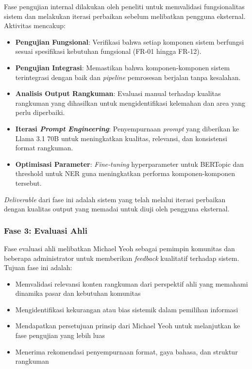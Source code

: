 Fase pengujian internal dilakukan oleh peneliti untuk memvalidasi fungsionalitas sistem dan melakukan iterasi perbaikan sebelum melibatkan pengguna eksternal. Aktivitas mencakup:

\begin{itemize}
\item \textbf{Pengujian Fungsional}: Verifikasi bahwa setiap komponen sistem berfungsi sesuai spesifikasi kebutuhan fungsional (FR-01 hingga FR-12).

\item \textbf{Pengujian Integrasi}: Memastikan bahwa komponen-komponen sistem terintegrasi dengan baik dan \textit{pipeline} pemrosesan berjalan tanpa kesalahan.

\item \textbf{Analisis Output Rangkuman}: Evaluasi manual terhadap kualitas rangkuman yang dihasilkan untuk mengidentifikasi kelemahan dan area yang perlu diperbaiki.

\item \textbf{Iterasi \textit{Prompt Engineering}}: Penyempurnaan \textit{prompt} yang diberikan ke Llama 3.1 70B untuk meningkatkan kualitas, relevansi, dan konsistensi format rangkuman.

\item \textbf{Optimisasi Parameter}: \textit{Fine-tuning} hyperparameter untuk BERTopic dan threshold untuk NER guna meningkatkan performa komponen-komponen tersebut.
\end{itemize}

\textit{Deliverable} dari fase ini adalah sistem yang telah melalui iterasi perbaikan dengan kualitas output yang memadai untuk diuji oleh pengguna eksternal.

\subsubsection{Fase 3: Evaluasi Ahli}

Fase evaluasi ahli melibatkan Michael Yeoh sebagai pemimpin komunitas dan beberapa administrator untuk memberikan \textit{feedback} kualitatif terhadap sistem. Tujuan fase ini adalah:

\begin{itemize}
\item Memvalidasi relevansi konten rangkuman dari perspektif ahli yang memahami dinamika pasar dan kebutuhan komunitas
\item Mengidentifikasi kekurangan atau bias sistemik dalam pemilihan informasi
\item Mendapatkan persetujuan prinsip dari Michael Yeoh untuk melanjutkan ke fase pengujian yang lebih luas
\item Menerima rekomendasi penyempurnaan format, gaya bahasa, dan struktur rangkuman
\end{itemize}

